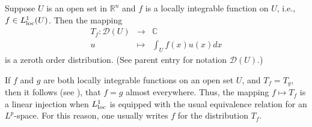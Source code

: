 \documentclass[12pt]{article}
\newcommand{\sR}[0]{\mathbb{R}}
\newcommand{\sC}[0]{\mathbb{C}}
\begin{document}
\newcommand{\cD}[0]{\mathcal{D}}

Suppose $U$ is an open set in $\sR^n$ and $f$ is a locally
integrable function on $U$, i.e., $f\in L^1_{\scriptsize{\mbox{loc}}}(U)$.
Then the mapping
\begin{eqnarray*}
T_f: \cD(U) &\to& \sC \\
     u      &\mapsto& \int_U f(x) u(x) dx
\end{eqnarray*}
is a zeroth order distribution. (See parent entry for notation $\cD(U)$.)


If $f$ and $g$ are both locally integrable functions on an open set $U$,
and $T_f=T_g$, then it follows (see 
),
that $f=g$ almost everywhere. Thus, the mapping $f\mapsto T_f$
is a linear injection when $L^1_{\scriptsize{\mbox{loc}}}$ is equipped with
the usual equivalence relation for an $L^p$-space. For this reason,
one usually writes $f$ for the distribution $T_f$.
\end{document}
